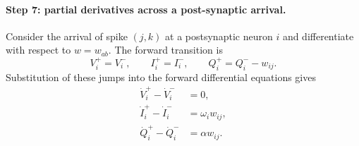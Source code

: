 \paragraph{Step 7: partial derivatives across a post-synaptic arrival.}
Consider the arrival of spike $(j,k)$ at a postsynaptic neuron $i$ and
differentiate with respect to $w=w_{ab}$. The forward transition is
\begin{equation}
    V_i^+=V_i^-,
    \qquad
    I_i^+=I_i^-,
    \qquad
    Q_i^+=Q_i^- -w_{ij}.
    \label{eq:tes-arrival-transition-proof}
\end{equation}
Substitution of these jumps into the forward differential equations gives
\begin{align}
    \dot V_i^+-\dot V_i^-
      &=0,
      \nonumber\\
    \dot I_i^+-\dot I_i^-
      &
        =\omega_iw_{ij},
      \nonumber\\
    \dot Q_i^+-\dot Q_i^-
      &
        =\alpha w_{ij}.
    \label{eq:tes-arrival-flow-change}
\end{align}

